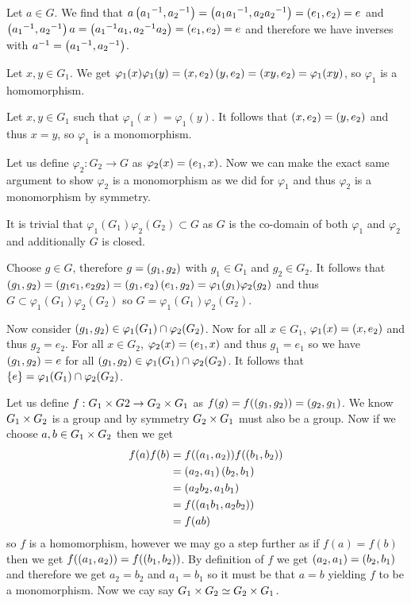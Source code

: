 \documentclass{article}
\begin{document}
Let $a \in G$. We find that $a\left( {{a_1}^{-1}} , {{a_2}^{-1}} \right) = \left( {a_1{a_1}^{-1}} , {a_2{a_2}^{-1}} \right) = \left( {e_1} , {e_2} \right) = e$ and $\left( {{a_1}^{-1}} , {{a_2}^{-1}} \right)a = \left( {{a_1}^{-1}a_1} , {{a_2}^{-1}a_2} \right) = \left( {e_1} , {e_2} \right) = e$ and therefore we have inverses with $a^{-1} = \left( {{a_1}^{-1}} , {{a_2}^{-1}} \right)$.

 Let $x,y\in G_1$. We get $\varphi_1(x)\varphi_1(y) = \left( {x} , {e_2} \right)\left( {y} , {e_2} \right) = \left( {xy} , {e_2} \right) = \varphi_1(xy)$, so $\varphi_1$ is a homomorphism.

Let $x,y \in G_1$ such that $\varphi_1(x) = \varphi_1(y)$. It follows that $\left( {x} , {e_2} \right) = \left( {y} , {e_2} \right)$ and thus $x=y$, so $\varphi_1$ is a monomorphism.

 Let us define $\varphi_2:G_2\to G$ as $\varphi_2(x) = \left( {e_1} , {x} \right)$. Now we can make the exact same argument to show $\varphi_2$ is a monomorphism as we did for $\varphi_1$ and thus $\varphi_2$ is a monomorphism by symmetry.

 It is trivial that $\varphi_1(G_1)\varphi_2(G_2) \subset G$ as $G$ is the co-domain of both $\varphi_1$ and $\varphi_2$ and additionally $G$ is closed.

Choose $g \in G$, therefore $g = \left( {g_1} , {g_2} \right)$ with $g_1 \in G_1$ and $g_2 \in G_2$. It follows that $\left( {g_1} , {g_2} \right) = \left( {g_1e_1} , {e_2g_2} \right) = \left( {g_1} , {e_2} \right)\left( {e_1} , {g_2} \right) = \varphi_1(g_1)\varphi_2(g_2)$ and thus $G \subset \varphi_1(G_1)\varphi_2(G_2)$ so $G=\varphi_1(G_1)\varphi_2(G_2)$.

Now consider $\left( {g_1} , {g_2} \right)\in\varphi_1(G_1)\cap\varphi_2(G_2)$. Now for all $x \in G_1$, $\varphi_1(x) = \left( {x} , {e_2} \right)$ and thus $g_2 = e_2$. For all $x \in G_2$, $\varphi_2(x) = \left( {e_1} , {x} \right)$ and thus $g_1 = e_1$ so we have $\left( {g_1} , {g_2} \right) = e$ for all $\left( {g_1} , {g_2} \right) \in \varphi_1(G_1)\cap\varphi_2(G_2)$. It follows that $\left\{ {e} \right\} = \varphi_1(G_1)\cap\varphi_2(G_2)$.

 Let us define $f: G_1\times G2 \to G_2\times G_1$ as $f(g) = f(\left( {g_1} , {g_2} \right)) = \left( {g_2} , {g_1} \right)$. We know $G_1\times G_2$ is a group and by symmetry $G_2\times G_1$ must also be a group. Now if we choose $a,b \in G_1\times G_2$ then we get
\begin{align*}
f(a)f(b) &= f(\left( {a_1} , {a_2} \right))f(\left( {b_1} , {b_2} \right)) \\
&= \left( {a_2} , {a_1} \right)\left( {b_2} , {b_1} \right) \\
&= \left( {a_2b_2} , {a_1b_1} \right) \\
&= f(\left( {a_1b_1} , {a_2b_2} \right)) \\
&= f(ab)
\end{align*}
so $f$ is a homomorphism, however we may go a step further as if $f(a) = f(b)$ then we get $f(\left( {a_1} , {a_2} \right)) = f(\left( {b_1} , {b_2} \right))$. By definition of $f$ we get $\left( {a_2} , {a_1} \right) = \left( {b_2} , {b_1} \right)$ and therefore we get $a_2 = b_2$ and $a_1 = b_1$ so it must be that $a = b$ yielding $f$ to be a monomorphism. Now we cay say $G_1\times G_2 \simeq G_2\times G_1$.
\end{document}
